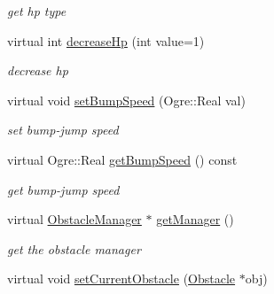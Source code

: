 \begin{DoxyCompactItemize}
\begin{DoxyCompactList}\small\item\em get hp type \end{DoxyCompactList}\item 
virtual int \hyperlink{class_n_c_t_u_1_1_obstacle_aaec0ed1185982b1d2507a8d24adcfdfc}{decrease\+Hp} (int value=1)\hypertarget{class_n_c_t_u_1_1_obstacle_aaec0ed1185982b1d2507a8d24adcfdfc}{}\label{class_n_c_t_u_1_1_obstacle_aaec0ed1185982b1d2507a8d24adcfdfc}

\begin{DoxyCompactList}\small\item\em decrease hp \end{DoxyCompactList}\item 
virtual void \hyperlink{class_n_c_t_u_1_1_obstacle_ad89e5a33bf7f5aa52a46370cd7162a4b}{set\+Bump\+Speed} (Ogre\+::\+Real val)\hypertarget{class_n_c_t_u_1_1_obstacle_ad89e5a33bf7f5aa52a46370cd7162a4b}{}\label{class_n_c_t_u_1_1_obstacle_ad89e5a33bf7f5aa52a46370cd7162a4b}

\begin{DoxyCompactList}\small\item\em set bump-\/jump speed \end{DoxyCompactList}\item 
virtual Ogre\+::\+Real \hyperlink{class_n_c_t_u_1_1_obstacle_a342a664e19976891d45d9309821f1d81}{get\+Bump\+Speed} () const \hypertarget{class_n_c_t_u_1_1_obstacle_a342a664e19976891d45d9309821f1d81}{}\label{class_n_c_t_u_1_1_obstacle_a342a664e19976891d45d9309821f1d81}

\begin{DoxyCompactList}\small\item\em get bump-\/jump speed \end{DoxyCompactList}\item 
virtual \hyperlink{class_n_c_t_u_1_1_obstacle_manager}{Obstacle\+Manager} $\ast$ \hyperlink{class_n_c_t_u_1_1_obstacle_a2c909e22367353721b9efad22cffd190}{get\+Manager} ()\hypertarget{class_n_c_t_u_1_1_obstacle_a2c909e22367353721b9efad22cffd190}{}\label{class_n_c_t_u_1_1_obstacle_a2c909e22367353721b9efad22cffd190}

\begin{DoxyCompactList}\small\item\em get the obstacle manager \end{DoxyCompactList}\item 
virtual void \hyperlink{class_n_c_t_u_1_1_obstacle_aa1aec7492db31b24b428290ad34e5058}{set\+Current\+Obstacle} (\hyperlink{class_n_c_t_u_1_1_obstacle}{Obstacle} $\ast$obj)\hypertarget{class_n_c_t_u_1_1_obstacle_aa1aec7492db31b24b428290ad34e5058}{}\label{class_n_c_t_u_1_1_obstacle_aa1aec7492db31b24b428290ad34e5058}


\end{DoxyCompactItemize}
